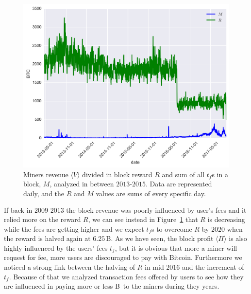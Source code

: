 \documentclass[USenglish]{uit-thesis}
\def\bitcoin{\leavevmode\rlap{\hskip.5pt-}B}
\begin{document}
\begin{figure}[h]
	\centering
	\includegraphics[width=1\textwidth]{img/reward_fee}
	\caption{Miners revenue $\langle V \rangle$ divided in block reward $R$ and sum
		of all $t_f$s in a block, $M$, analyzed in between $2013$-$2015$. Data are
	represented daily, and the $R$ and $M$ values are sums of every specific day.}
	\label{fig:reward_fee}
\end{figure}
If back in $2009$-$2013$ the block revenue was
poorly influenced by user's fees and it relied more
on the reward $R$, we can see instead
in Figure~\ref{fig:reward_fee} that $R$ is decreasing
while the fees are getting higher and we expect 
$t_f$s to overcome $R$ by $2020$ when the
reward is halved again at $6.25$\,\bitcoin.
As we have seen, the block profit $\langle \Pi \rangle$
is also highly influenced by the
users' fees $t_f$,
but it is obvious that more a miner will
request for fee,
more users are discouraged to pay with Bitcoin.
Furthermore we noticed a strong link between
the halving of $R$ in mid $2016$ and the increment of $t_f$.
Because of that we analyzed transaction fees
offered by users to see how they are influenced
in paying more or less \bitcoin~to the miners during
they years.
\end{document}
